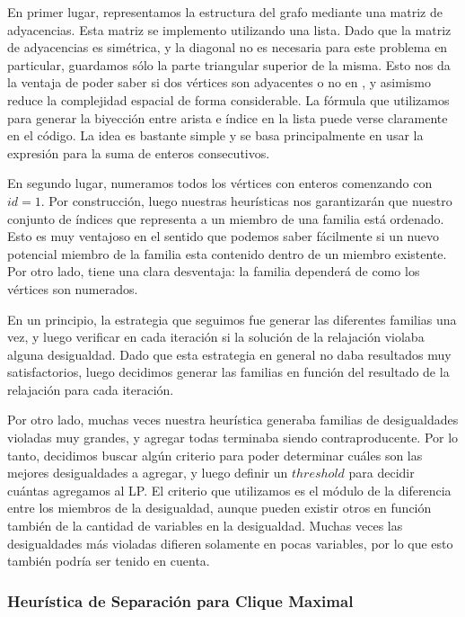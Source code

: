 En primer lugar, representamos la estructura del grafo mediante una matriz de adyacencias. Esta matriz se implemento utilizando una lista. Dado que la matriz de adyacencias es simétrica, y la diagonal no es necesaria para este problema en particular, guardamos sólo la parte triangular superior de la misma. Esto nos da la ventaja de poder saber si dos vértices son adyacentes o no en , y asimismo reduce la complejidad espacial de forma considerable. La fórmula que utilizamos para generar la biyección entre arista e índice en la lista puede verse claramente en el código. La idea es bastante simple y se basa principalmente en usar la expresión para la suma de enteros consecutivos.

En segundo lugar, numeramos todos los vértices con enteros comenzando con $id = 1$. Por construcción, luego nuestras heurísticas nos garantizarán que nuestro conjunto de índices que representa a un miembro de una familia está ordenado. Esto es muy ventajoso en el sentido que podemos saber fácilmente si un nuevo potencial miembro de la familia esta contenido dentro de un miembro existente. Por otro lado, tiene una clara desventaja: la familia dependerá de como los vértices son numerados.

En un principio, la estrategia que seguimos fue generar las diferentes familias una vez, y luego verificar en cada iteración si la solución de la relajación violaba alguna desigualdad. Dado que esta estrategia en general no daba resultados muy satisfactorios, luego decidimos generar las familias en función del resultado de la relajación para cada iteración.

Por otro lado, muchas veces nuestra heurística generaba familias de desigualdades violadas muy grandes, y agregar todas terminaba siendo contraproducente. Por lo tanto, decidimos buscar algún criterio para poder determinar cuáles son las mejores desigualdades a agregar, y luego definir un $threshold$ para decidir cuántas agregamos al LP. El criterio que utilizamos es el módulo de la diferencia entre los miembros de la desigualdad, aunque pueden existir otros en función también de la cantidad de variables en la desigualdad. Muchas veces las desigualdades más violadas difieren solamente en pocas variables, por lo que esto también podría ser tenido en cuenta.

\subsubsection{Heurística de Separación para Clique Maximal}

